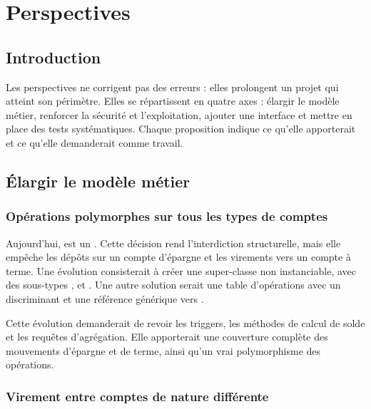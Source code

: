 \chapter{Perspectives}
\label{chap:perspectives}

\section{Introduction}

Les perspectives ne corrigent pas des erreurs : elles prolongent un projet qui
atteint son périmètre. Elles se répartissent en quatre axes : élargir le modèle
métier, renforcer la sécurité et l'exploitation, ajouter une interface et
mettre en place des tests systématiques. Chaque proposition indique ce qu'elle
apporterait et ce qu'elle demanderait comme travail.

\section{Élargir le modèle métier}

\subsection{Opérations polymorphes sur tous les types de comptes}

Aujourd'hui,  est un
. Cette décision rend l'interdiction structurelle,
mais elle empêche les dépôts sur un compte d'épargne et les virements vers un
compte à terme. Une évolution consisterait à créer une super-classe
 non instanciable, avec des sous-types
,  et
. Une autre solution serait une table d'opérations
avec un discriminant et une référence générique vers .

Cette évolution demanderait de revoir les triggers, les méthodes de calcul de
solde et les requêtes d'agrégation. Elle apporterait une couverture complète
des mouvements d'épargne et de terme, ainsi qu'un vrai polymorphisme des
opérations.

\subsection{Virement entre comptes de nature différente}

